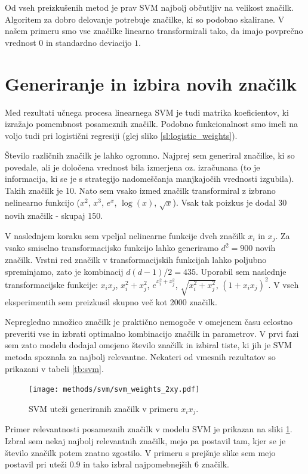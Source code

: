 \documentclass[11pt,a4paper,openany]{book}
\begin{document}
Od vseh preizkušenih metod je prav SVM najbolj občutljiv na velikost značilk. Algoritem za dobro delovanje potrebuje značilke, ki so podobno skalirane. V našem primeru smo vse značilke linearno transformirali tako, da imajo povprečno vrednost $0$ in standardno deviacijo $1$.


\section{Generiranje in izbira novih značilk}
Med rezultati učnega procesa linearnega SVM je tudi matrika koeficientov, ki izražajo pomembnost posameznih značilk. Podobno funkcionalnost smo imeli na voljo tudi pri logistični regresiji (glej sliko \ref{sl:logistic_weights}).

Število različnih značilk je lahko ogromno. Najprej sem generiral značilke, ki so povedale, ali je določena vrednost bila izmerjena oz. izračunana (to je informacija, ki se je s strategijo nadomeščanja manjkajočih vrednosti izgubila). Takih značilk je 10. Nato sem vsako izmed značilk transformiral z izbrano nelinearno funkcijo ($x^2$, $x^3$, $e^{x}$, $\log(x)$, $\sqrt{x}$). Vsak tak poizkus je dodal 30 novih značilk - skupaj 150.

V naslednjem koraku sem vpeljal nelinearne funkcije dveh značilk $x_i$ in $x_j$. Za vsako smiselno transformacijsko funkcijo lahko generiramo $d^2 = 900$ novih značilk. Vrstni red značilk v transformacijskih funkcijah lahko poljubno spreminjamo, zato je kombinacij $d(d-1)/2 = 435$. Uporabil sem naslednje transformacijske funkcije: $x_ix_j$, $x_i^2 + x_j^2$, $e^{x_i^2 + x_j^2}$, $\sqrt{x_i^2 + x_j^2}$, $(1 + x_ix_j)^2$. V vseh eksperimentih sem preizkusil skupno več kot 2000 značilk.

Nepregledno množico značilk je praktično nemogoče v omejenem času celostno preveriti vse in izbrati optimalno kombinacijo značilk in parametrov. V prvi fazi sem zato modelu dodajal omejeno število značilk in izbiral tiste, ki jih je SVM metoda spoznala za najbolj relevantne. Nekateri od vmesnih rezultatov so prikazani v tabeli \ref{tb:svm}.

\begin{figure}[h]
	\centering	
	\texttt{[image: methods/svm/svm\_weights\_2xy.pdf]}
	
	\caption{SVM uteži generiranih značilk v primeru $x_ix_j$.}
	\label{sl:svm_xy_weights}
\end{figure}

Primer relevantnosti posameznih značilk v modelu SVM je prikazan na sliki \ref{sl:svm_xy_weights}. Izbral sem nekaj najbolj relevantnih značilk, mejo pa postavil tam, kjer se je število značilk potem znatno zgostilo. V primeru s prejšnje slike sem mejo postavil pri uteži $\num{0,9}$ in tako izbral najpomebnejših 6 značilk.
\end{document}
